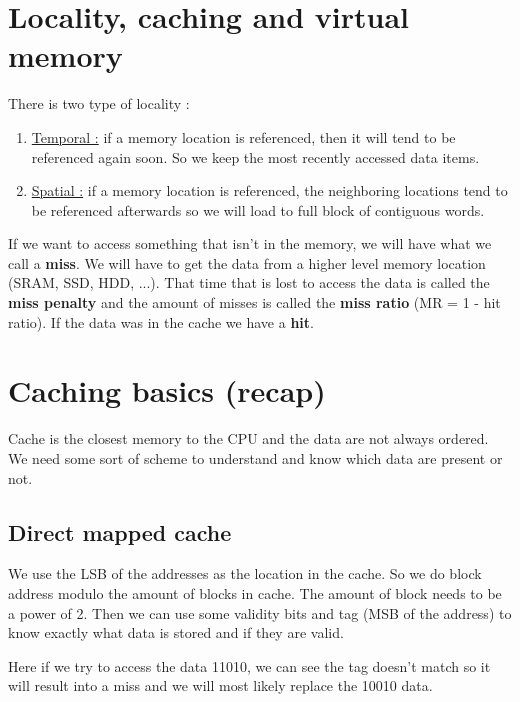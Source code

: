 \documentclass{report}
\begin{document}
\section{Locality, caching and virtual memory}

There is two type of locality : 

\begin{enumerate}
    \item \underline{Temporal :} if a memory location is referenced, then it will tend to be referenced again soon. So we keep the most recently accessed data items.
    \item \underline{Spatial :} if a memory location is referenced, the neighboring locations tend to be referenced afterwards so we will load to full block of contiguous words.
\end{enumerate}

If we want to access something that isn't in the memory, we will have what we call a \textbf{miss}. We will have to get the data from a higher level memory location (SRAM, SSD, HDD, ...). That time that is lost to access the data is called the \textbf{miss penalty} and the amount of misses is called the \textbf{miss ratio} (MR = 1 - hit ratio).
If the data was in the cache we have a \textbf{hit}.

\section{Caching basics (recap)}

Cache is the closest memory to the CPU and the data are not always ordered. We need some sort of scheme to understand and know which data are present or not.

\subsection{Direct mapped cache}

We use the LSB of the addresses as the location in the cache. So we do block address modulo the amount of blocks in cache. The amount of block needs to be a power of 2.
Then we can use some validity bits and tag (MSB of the address) to know exactly what data is stored and if they are valid.

Here if we try to access the data 11010, we can see the tag doesn't match so it will result into a miss and we will most likely replace the 10010 data.
\end{document}
